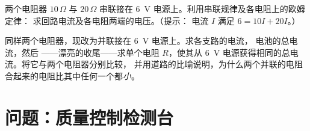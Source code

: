 \begin{exercise}[$\star\star$]\label{exo:g8:ohms-law:11}
两个电阻器 $10\,\Omega$ 与 $20\,\Omega$ 串联接在
\qty{6}{V} 电源上。利用串联规律及各电阻上的欧姆定律：
求回路电流及各电阻两端的电压。（提示：
电流 $I$ 满足 $6 = 10 I + 20 I$。）
\end{exercise}

\begin{exercise}[$\star\star\star$]\label{exo:g8:ohms-law:12}
同样两个电阻器，现改为并联接在 \qty{6}{V} 电源上。求各支路的电流，
电池的总电流，然后
——漂亮的收尾——求单个电阻 $R$，使其从
\qty{6}{V} 电源获得相同的总电流。将它与两个电阻器分别比较，
并用道路的比喻说明，为什么两个并联的电阻
合起来的电阻比其中任何一个都\emph{小}。
\end{exercise}

\section{问题：质量控制检测台}


